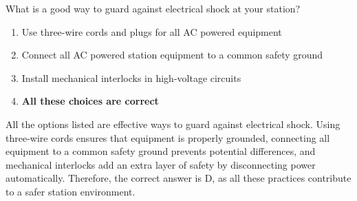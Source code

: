\begin{tcolorbox}[colback=gray!10!white,colframe=black!75!black,title={T0A06}]
    What is a good way to guard against electrical shock at your station?
    \begin{enumerate}[label=\Alph*),noitemsep]
        \item Use three-wire cords and plugs for all AC powered equipment
        \item Connect all AC powered station equipment to a common safety ground
        \item Install mechanical interlocks in high-voltage circuits
        \item \textbf{All these choices are correct}
    \end{enumerate}
\end{tcolorbox}

All the options listed are effective ways to guard against electrical shock. Using three-wire cords ensures that equipment is properly grounded, connecting all equipment to a common safety ground prevents potential differences, and mechanical interlocks add an extra layer of safety by disconnecting power automatically. Therefore, the correct answer is D, as all these practices contribute to a safer station environment.
